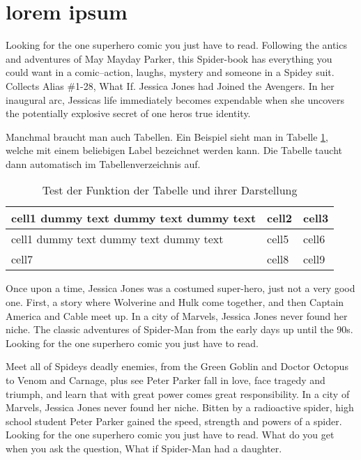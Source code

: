     \section{lorem ipsum}
    Looking for the one superhero comic you just have to read. Following the antics and adventures of May Mayday Parker, this Spider-book has everything you could want in a comic--action, laughs, mystery and someone in a Spidey suit. Collects Alias \#1-28, What If. Jessica Jones had Joined the Avengers. In her inaugural arc, Jessicas life immediately becomes expendable when she uncovers the potentially explosive secret of one heros true identity. 
    
    Manchmal braucht man auch Tabellen. Ein Beispiel sieht man in Tabelle \ref{tabelle1}, welche mit einem beliebigen Label bezeichnet werden kann. Die Tabelle taucht dann automatisch im Tabellenverzeichnis auf.
    
    \begin{table}[h!]
    \begin{center}
    \begin{tabular}{ | m{5cm} | m{1cm}| m{1cm} | } 
    \hline
    cell1 dummy text dummy text dummy text& cell2 & cell3 \\ 
    \hline
    cell1 dummy text dummy text dummy text & cell5 & cell6 \\ 
    \hline
    cell7 & cell8 & cell9 \\ 
    \hline
    \end{tabular}
    \end{center}
    \caption{Test der Funktion der Tabelle und ihrer Darstellung}
    \label{tabelle1}
    \end{table}
    
    
    Once upon a time, Jessica Jones was a costumed super-hero, just not a very good one. First, a story where Wolverine and Hulk come together, and then Captain America and Cable meet up. In a city of Marvels, Jessica Jones never found her niche. The classic adventures of Spider-Man from the early days up until the 90s. Looking for the one superhero comic you just have to read.
    
    Meet all of Spideys deadly enemies, from the Green Goblin and Doctor Octopus to Venom and Carnage, plus see Peter Parker fall in love, face tragedy and triumph, and learn that with great power comes great responsibility. In a city of Marvels, Jessica Jones never found her niche. Bitten by a radioactive spider, high school student Peter Parker gained the speed, strength and powers of a spider. Looking for the one superhero comic you just have to read. What do you get when you ask the question, What if Spider-Man had a daughter.
    
